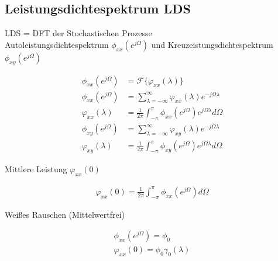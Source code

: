 \documentclass[10pt,a4paper]{article}
\begin{document}
\subsection{Leistungsdichtespektrum LDS}
LDS = DFT der Stochastischen Prozesse \\
Autoleistungsdichtespektrum  $\phi_{xx}(e^{j\Omega})$ und Kreuzeistungsdichtespektrum $\phi_{xy}(e^{j\Omega})$
  \begin{mdframed}[style=exercise]
    \begin{align}
        \phi_{xx}(e^{j\Omega}) &= \mathcal{F}\{ \varphi_{xx}(\lambda)\} \\
        \phi_{xx}(e^{j\Omega}) &= \sum_{\lambda=-\infty}^{\infty} \varphi_{xx}(\lambda) e^{-j\Omega\lambda} \\
        \varphi_{xx}(\lambda) &= \frac{1}{2\pi} \displaystyle\int_{-\pi}^{\pi} \phi_{xx}(e^{j\Omega})e^{j\Omega\lambda}d\Omega \\
        \phi_{xy}(e^{j\Omega}) &= \sum_{\lambda=-\infty}^{\infty} \varphi_{xy}(\lambda) e^{-j\Omega\lambda} \\
        \varphi_{xy}(\lambda) &= \frac{1}{2\pi} \displaystyle\int_{-\pi}^{\pi} \phi_{xy}(e^{j\Omega})e^{j\Omega\lambda}d\Omega \end{align}
  \end{mdframed}
Mittlere Leistung $\varphi_{xx}(0)$
  \begin{mdframed}[style=exercise]
    \begin{align}
        \varphi_{xx}(0) = \frac{1}{2\pi} \displaystyle\int_{-\pi}^{\pi} \phi_{xx}(e^{j\Omega})d\Omega
    \end{align}
  \end{mdframed}
Weißes Rauschen (Mittelwertfrei) 
  \begin{mdframed}[style=exercise]
    \begin{align}
        \phi_{xx}(e^{j\Omega}) = \phi_0\\
        \varphi_{xx}(0) = \phi_0 \gamma_0(\lambda)
    \end{align}
  \end{mdframed}
\end{document}
